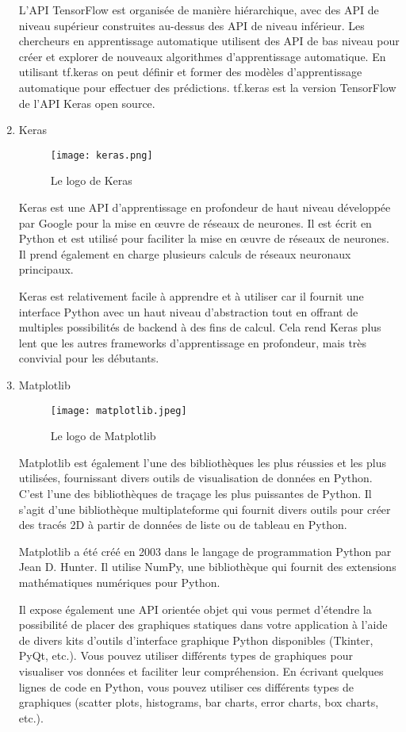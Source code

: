 \begin{enumerate}
        L'API TensorFlow est organisée de manière hiérarchique, avec des API de  niveau supérieur construites au-dessus des API de niveau inférieur. Les chercheurs en apprentissage automatique utilisent des API de bas niveau pour créer et explorer de nouveaux algorithmes d'apprentissage automatique. En utilisant tf.keras on peut définir et former des modèles d'apprentissage automatique  pour effectuer des prédictions. tf.keras est la version TensorFlow de l'API Keras open source.

        \bfseries
        \item Keras
        \begin{figure}[H]
            \centering
            \texttt{[image: keras.png]}
            \caption{Le logo de Keras}\label{fig:keras}
        \end{figure}
        \normalfont
        Keras est une API d'apprentissage en profondeur de haut niveau développée par Google pour la mise en œuvre de réseaux de neurones. Il est écrit en Python et est utilisé pour faciliter la mise en œuvre de réseaux de neurones. Il prend également en charge plusieurs calculs de  réseaux neuronaux principaux. 
        
        Keras est relativement facile à apprendre et à utiliser car il fournit une interface Python avec un haut niveau d'abstraction tout en offrant de multiples possibilités de backend à des fins de calcul. Cela rend Keras plus lent que les autres frameworks d'apprentissage en profondeur, mais très convivial pour les débutants.

        \bfseries
        \item Matplotlib
        \begin{figure}[H]
            \centering
            \texttt{[image: matplotlib.jpeg]}
            \caption{Le logo de Matplotlib}\label{fig:matplotlib}
        \end{figure}
        \normalfont
        Matplotlib est également l'une des bibliothèques les plus réussies et les plus utilisées, fournissant divers outils de visualisation de données en Python. 
        C'est l'une des bibliothèques de traçage les plus puissantes de Python. Il s'agit d'une bibliothèque multiplateforme qui fournit divers outils pour créer des tracés 2D à partir de données de liste ou de tableau en Python. 
        
        Matplotlib a été créé en 2003 dans le langage de programmation Python par Jean D. Hunter. Il utilise NumPy, une bibliothèque qui fournit des extensions mathématiques numériques pour Python. 
        
        Il expose également une API orientée objet qui vous permet d'étendre la possibilité de placer des graphiques statiques dans votre application à l'aide de divers kits d'outils d'interface graphique Python disponibles (Tkinter, PyQt, etc.). 
        Vous pouvez utiliser différents types de graphiques pour visualiser vos données et faciliter leur compréhension. En écrivant quelques lignes de code en Python, vous pouvez utiliser ces différents types de graphiques (scatter plots, histograms, bar charts, error charts, box charts, etc.).

        \bfseries
    \end{enumerate}
